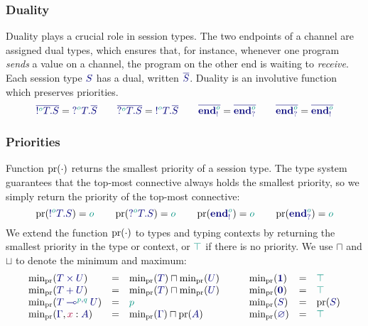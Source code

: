 \documentclass[main.tex]{subfiles}
\begin{document}
\subsubsection*{Duality}
Duality plays a crucial role in session types. The two endpoints of a channel are assigned dual types, which ensures that, for instance, whenever one program \emph{sends} a value on a channel, the program on the other end is waiting to \emph{receive}. Each session type $\ty{S}$ has a dual, written $\ty{\co{S}}$. Duality is an involutive function which preserves priorities.
\[
  \ty{\co{\tysend[\cs{o}]{T}{S}}} = \ty{\tyrecv[\cs{o}]{T}{\co{S}}}
  \qquad
  \ty{\co{\tyrecv[\cs{o}]{T}{S}}} = \ty{\tysend[\cs{o}]{T}{\co{S}}}
  \qquad
  \ty{\co{\tyends[\cs{o}]}} = \ty{\co{\tyendr[\cs{o}]}}
  \qquad
  \ty{\co{\tyendr[\cs{o}]}} = \ty{\co{\tyends[\cs{o}]}}
\]

\subsubsection*{Priorities}
Function $\operatorname{pr}(\cdot)$ returns the smallest priority of a session type. The type system guarantees that the top-most connective always holds the smallest priority, so we simply return the priority of the top-most connective:
\[
  \pr(\ty{\tysend[\cs{o}]{T}{S}}) = \cs{o}
  \qquad
  \pr(\ty{\tyrecv[\cs{o}]{T}{S}}) = \cs{o}
  \qquad
  \pr(\ty{\tyends[\cs{o}]})       = \cs{o}
  \qquad
  \pr(\ty{\tyendr[\cs{o}]})       = \cs{o}
\]
We extend the function $\operatorname{pr}(\cdot)$ to types and typing contexts by returning the smallest priority in the type or context, or $\cs{\top}$ if there is no priority. We use $\sqcap$ and $\sqcup$ to denote the minimum and maximum:
\[
\begin{array}{lcl}
  \minpr(\ty{\typrod{T}{U}})                 & = & \minpr({\ty{T}})\sqcap\minpr({\ty{U}}) \\
  \minpr(\ty{\tysum{T}{U}})                  & = & \minpr({\ty{T}})\sqcap\minpr({\ty{U}}) \\
  \minpr(\ty{\tylolli[\cs{p},\cs{q}]{T}{U}}) & = & \cs{p} \\
  \minpr(\ty{\Gamma}, \tmty{x}{A})           & = & \minpr(\ty{\Gamma})\sqcap\pr(\ty{A})
\end{array}
\qquad
\begin{array}{lcl}
  \minpr(\ty{\tyunit})                       & = & \ptop \\
  \minpr(\ty{\tyvoid})                       & = & \ptop \\
  \minpr(\ty{S})                             & = & \pr(\ty{S}) \\
  \minpr(\ty{\emptyenv})                     & = & \ptop
\end{array}
\]
\end{document}
